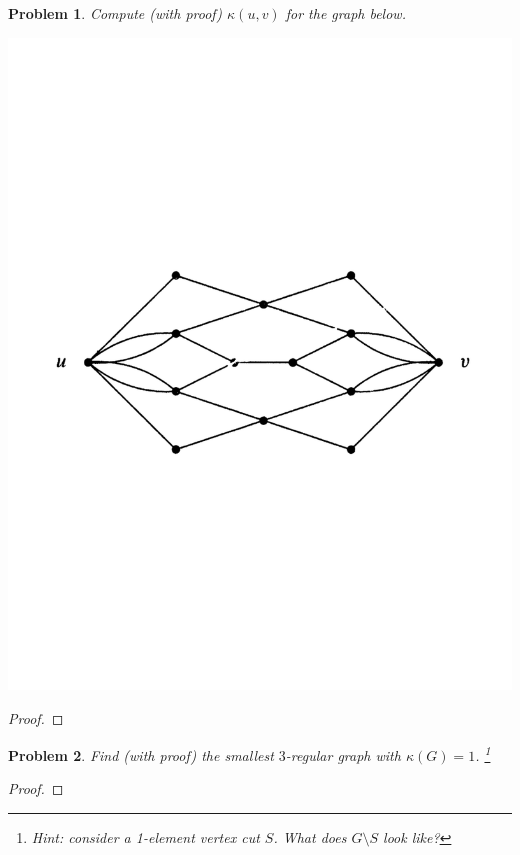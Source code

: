 \documentclass[11pt]{article}
\newtheorem{problem}{Problem}
\begin{document}
\pagebreak
\begin{problem}
Compute (with proof) $\kappa(u,v)$ for the graph below.
\begin{center}
\includegraphics[scale=.4]{hw6-graph.pdf}
\end{center}
\end{problem}

\begin{proof}

\end{proof}

\pagebreak
\begin{problem}
Find (with proof) the smallest $3$-regular graph with $\kappa(G)=1$. \footnote{Hint: consider a 1-element vertex cut $S$. What does $G\setminus S$ look like? } 
\end{problem}

\begin{proof}

\end{proof} 
\end{document}
